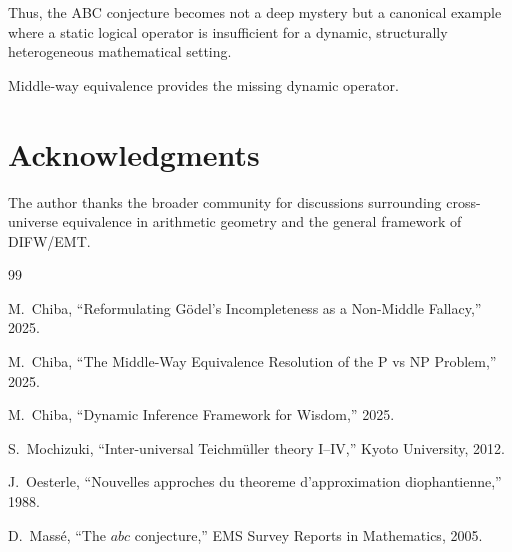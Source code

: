 \documentclass[11pt]{article}
\theoremstyle{definition}
\theoremstyle{remark}
\begin{document}
Thus, the ABC conjecture becomes not a deep mystery but a canonical
example where a static logical operator is insufficient for a dynamic,
structurally heterogeneous mathematical setting.

Middle-way equivalence provides the missing dynamic operator.

\section*{Acknowledgments}

The author thanks the broader community for discussions surrounding
cross-universe equivalence in arithmetic geometry and the general
framework of DIFW/EMT.

\begin{thebibliography}{99}

M.~Chiba, ``Reformulating G{\"o}del's Incompleteness as a Non-Middle
Fallacy,'' 2025.

M.~Chiba, ``The Middle-Way Equivalence Resolution of the P vs NP
Problem,'' 2025.

M.~Chiba, ``Dynamic Inference Framework for Wisdom,'' 2025.

S.~Mochizuki, ``Inter-universal Teichm{\"u}ller theory I–IV,'' Kyoto
University, 2012.

J.~Oesterle, ``Nouvelles approches du theoreme d'approximation
diophantienne,'' 1988.

D.~Mass{\'e}, ``The $abc$ conjecture,'' EMS Survey Reports in
Mathematics, 2005.

\end{thebibliography}

\end{document}
